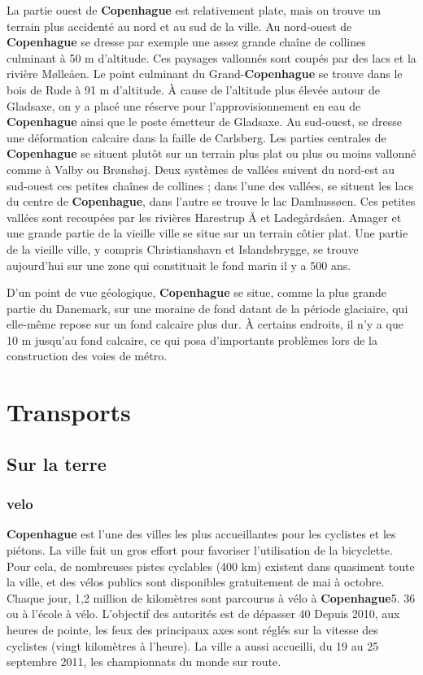 \documentclass[a4paper,10pt,openany]{memoir}
\begin{document}
La partie ouest de \textbf{Copenhague} est relativement plate, mais on trouve un terrain plus accidenté au nord 
et au sud de la ville.
Au nord-ouest de \textbf{Copenhague} se dresse par exemple une assez grande chaîne de collines culminant à 50 m 
d'altitude. Ces paysages vallonnés sont coupés par des lacs et la rivière Mølleåen.
Le point culminant du Grand-\textbf{Copenhague} se trouve dans le bois de Rude à 91 m d'altitude. À cause de 
l'altitude plus élevée autour de Gladsaxe, on y a placé une réserve pour l'approvisionnement en eau de 
\textbf{Copenhague} ainsi que le poste émetteur de Gladsaxe.
Au sud-ouest, se dresse une déformation calcaire dans la faille de Carlsberg.
Les parties centrales de \textbf{Copenhague} se situent plutôt sur un terrain plus plat ou plus ou moins vallonné 
comme à Valby ou Brønshøj.
Deux systèmes de vallées suivent du nord-est au sud-ouest ces petites chaînes de collines ; dans l'une des
vallées, se situent les lacs du centre de \textbf{Copenhague}, dans l'autre se trouve le lac Damhussøen. Ces petites
vallées sont recoupées par les rivières Harestrup Å et Ladegårdsåen.
Amager et une grande partie de la vieille ville se situe sur un terrain côtier plat. Une partie de la 
vieille ville, y compris Christianshavn et Islandsbrygge, se trouve aujourd'hui sur une zone qui constituait
le fond marin il y a 500 ans.

D'un point de vue géologique, \textbf{Copenhague} se situe, comme la plus grande partie du Danemark, sur une moraine
de fond datant de la période glaciaire, qui elle-même repose sur un fond calcaire plus dur. À certains 
endroits, il n'y a que 10 m jusqu'au fond calcaire, ce qui posa d'importants problèmes lors de la 
construction des voies de métro.

\chapter{Transports}

\section{Sur la terre}

\subsection{velo}
\textbf{Copenhague} est l'une des villes les plus accueillantes pour les cyclistes et les piétons.
La ville fait un gros effort pour favoriser l'utilisation de la bicyclette. Pour cela, de 
nombreuses pistes cyclables (400 km) existent dans quasiment toute la ville, et des vélos 
publics sont disponibles gratuitement de mai à octobre. Chaque jour, 1,2 million de kilomètres 
sont parcourus à vélo à \textbf{Copenhague}5. 36 %
ou à l'école à vélo. L'objectif des autorités est de dépasser 40 %
Depuis 2010, aux heures de pointe, les feux des principaux axes sont réglés sur la vitesse des 
cyclistes (vingt kilomètres à l'heure).
La ville a aussi accueilli, du 19 au 25 septembre 2011, les championnats du monde sur route.
\end{document}
